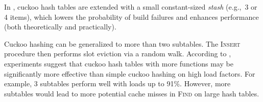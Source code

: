 In \cite{kirsch2009more}, cuckoo hash tables are extended with a small
constant-sized \emph{stash} (e.g.,\ 3 or 4 items), which lowers the probability
of build failures and enhances performance (both theoretically and practically).

Cuckoo hashing can be generalized to more than two subtables.
The \textsc{Insert} procedure then performs slot eviction via a random walk.
According to \cite{open-questions-cuckoo}, experiments suggest that cuckoo
hash tables with more functions may be significantly more effective than simple
cuckoo hashing on high load factors. For example, 3 subtables perform well
with loads up to 91\%. However, more subtables would lead to more potential
cache misses in \textsc{Find} on large hash tables.

